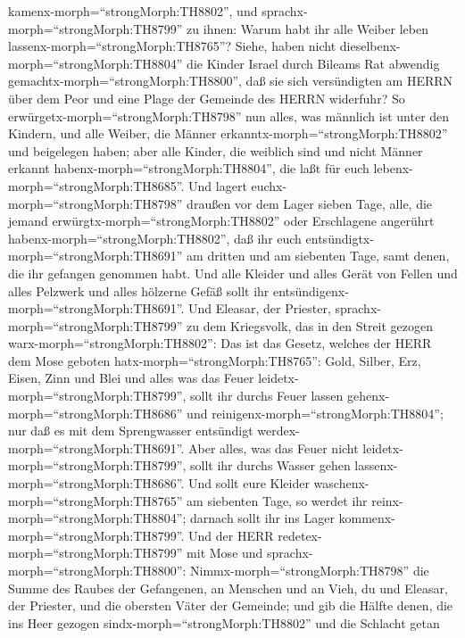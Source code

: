 kamenx-morph=``strongMorph:TH8802'',  und
sprachx-morph=``strongMorph:TH8799'' zu ihnen: Warum habt ihr alle
Weiber leben lassenx-morph=``strongMorph:TH8765''?  Siehe,
haben nicht dieselbenx-morph=``strongMorph:TH8804'' die Kinder Israel
durch Bileams Rat abwendig gemachtx-morph=``strongMorph:TH8800'', daß
sie sich versündigten am HERRN über dem Peor und eine Plage der Gemeinde
des HERRN widerfuhr?  So
erwürgetx-morph=``strongMorph:TH8798'' nun alles, was männlich ist unter
den Kindern, und alle Weiber, die Männer
erkanntx-morph=``strongMorph:TH8802'' und beigelegen haben;
 aber alle Kinder, die weiblich sind und nicht Männer
erkannt habenx-morph=``strongMorph:TH8804'', die laßt für euch
lebenx-morph=``strongMorph:TH8685''.  Und lagert
euchx-morph=``strongMorph:TH8798'' draußen vor dem Lager sieben Tage,
alle, die jemand erwürgtx-morph=``strongMorph:TH8802'' oder Erschlagene
angerührt habenx-morph=``strongMorph:TH8802'', daß ihr euch
entsündigtx-morph=``strongMorph:TH8691'' am dritten und am siebenten
Tage, samt denen, die ihr gefangen genommen habt.  Und alle
Kleider und alles Gerät von Fellen und alles Pelzwerk und alles hölzerne
Gefäß sollt ihr entsündigenx-morph=``strongMorph:TH8691''. 
Und Eleasar, der Priester, sprachx-morph=``strongMorph:TH8799'' zu dem
Kriegsvolk, das in den Streit gezogen warx-morph=``strongMorph:TH8802'':
Das ist das Gesetz, welches der HERR dem Mose geboten
hatx-morph=``strongMorph:TH8765'':  Gold, Silber, Erz,
Eisen, Zinn und Blei  und alles was das Feuer
leidetx-morph=``strongMorph:TH8799'', sollt ihr durchs Feuer lassen
gehenx-morph=``strongMorph:TH8686'' und
reinigenx-morph=``strongMorph:TH8804''; nur daß es mit dem Sprengwasser
entsündigt werdex-morph=``strongMorph:TH8691''. Aber alles, was das
Feuer nicht leidetx-morph=``strongMorph:TH8799'', sollt ihr durchs
Wasser gehen lassenx-morph=``strongMorph:TH8686''.  Und
sollt eure Kleider waschenx-morph=``strongMorph:TH8765'' am siebenten
Tage, so werdet ihr reinx-morph=``strongMorph:TH8804''; darnach sollt
ihr ins Lager kommenx-morph=``strongMorph:TH8799''.  Und
der HERR redetex-morph=``strongMorph:TH8799'' mit Mose und
sprachx-morph=``strongMorph:TH8800'': 
Nimmx-morph=``strongMorph:TH8798'' die Summe des Raubes der Gefangenen,
an Menschen und an Vieh, du und Eleasar, der Priester, und die obersten
Väter der Gemeinde;  und gib die Hälfte denen, die ins Heer
gezogen sindx-morph=``strongMorph:TH8802'' und die Schlacht getan
